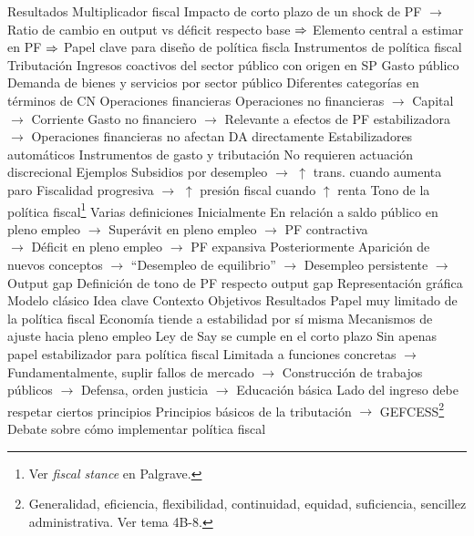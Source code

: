 \documentclass{nuevotema}
\begin{document}
\begin{esquemal}
			\3 Resultados
				\4 Multiplicador fiscal
				\4[] Impacto de corto plazo de un shock de PF
				\4[] $\to$ Ratio de cambio en output vs déficit respecto base
				\4[] $\then$ Elemento central a estimar en PF
				\4[] $\then$ Papel clave para diseño de política fiscla
		\2 Instrumentos de política fiscal
			\3 Tributación
				\4 Ingresos coactivos del sector público con origen en SP
			\3 Gasto público
				\4 Demanda de bienes y servicios por sector público
				\4 Diferentes categorías en términos de CN
				\4[] Operaciones financieras
				\4[] Operaciones no financieras
				\4[] $\to$ Capital
				\4[] $\to$ Corriente
				\4 Gasto no financiero
				\4[] $\to$ Relevante a efectos de PF estabilizadora
				\4[] $\to$ Operaciones financieras no afectan DA directamente
			\3 Estabilizadores automáticos
				\4 Instrumentos de gasto y tributación
				\4 No requieren actuación discrecional
				\4 Ejemplos
				\4[] Subsidios por desempleo
				\4[] $\to$ $\uparrow$ trans. cuando aumenta paro
				\4[] Fiscalidad progresiva
				\4[] $\to$ $\uparrow$ presión fiscal cuando $\uparrow$ renta
			\3 Tono de la política fiscal\footnote{Ver \textit{fiscal stance} en Palgrave.}
				\4 Varias definiciones
				\4 Inicialmente
				\4[] En relación a saldo público en pleno empleo
				\4[] $\to$ Superávit en pleno empleo $\to$ PF contractiva\\
				\4[] $\to$ Déficit en pleno empleo $\to$ PF expansiva
				\4 Posteriormente
				\4[] Aparición de nuevos conceptos
				\4[] $\to$ ``Desempleo de equilibrio''
				\4[] $\to$ Desempleo persistente
				\4[] $\to$ Output gap
				\4[] Definición de tono de PF respecto output gap
				\4 Representación gráfica
				\4[] 
		\2 Modelo clásico
			\3 Idea clave
				\4 Contexto
				\4 Objetivos
				\4 Resultados
			\3 Papel muy limitado de la política fiscal
				\4 Economía tiende a estabilidad por sí misma
				\4[] Mecanismos de ajuste hacia pleno empleo
				\4[] Ley de Say se cumple en el corto plazo
				\4[$\then$] Sin apenas papel estabilizador para política fiscal
				\4[$\then$] Limitada a funciones concretas
				\4[] $\to$ Fundamentalmente, suplir fallos de mercado
				\4[] $\to$ Construcción de trabajos públicos
				\4[] $\to$ Defensa, orden justicia
				\4[] $\to$  Educación básica
				\4[$\then$] Lado del ingreso debe respetar ciertos principios
				\4[] Principios básicos de la tributación
				\4[] $\to$ GEFCESS\footnote{Generalidad, eficiencia, flexibilidad, continuidad, equidad, suficiencia, sencillez administrativa. Ver tema 4B-8.}
				\4[$\then$] Debate sobre cómo implementar política fiscal

\end{esquemal}
\end{document}
